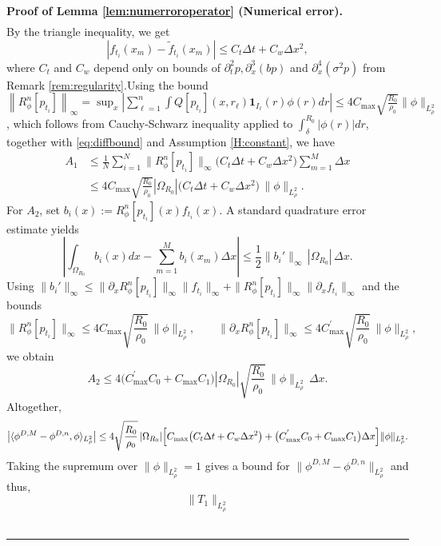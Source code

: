 \documentclass[12pt]{article}
\newenvironment{proof}[1][Proof]{\noindent\textbf{#1.} }{\ \rule{0.5em}{0.5em}}
\numberwithin{equation}{section}
\numberwithin{theorem}{section}
\begin{document}
\begin{proof}[Proof of Lemma \ref{lem:numerroroperator} (Numerical error)]
\begin{equation}
\begin{aligned}
\end{aligned}
\end{equation}
By the triangle inequality, we get
\begin{equation}
\left|f_{t_i}\left(x_m\right)-\tilde{f}_{t_i}\left(x_m\right)\right| \le C_t \Delta t+C_w \Delta x^2,
\end{equation}
where $C_t$ and $C_w$ depend only on bounds of $\partial_t^2 p, \partial_x^3(b p)$ and $\partial_x^4\left(\sigma^2 p\right)$ from Remark \eqref{rem:regularity}.Using the bound $\left\|R_\phi^n\left[p_{t_i}\right]\right\|_{\infty}=\sup _x\left|\sum_{\ell=1}^n \int Q\left[p_{t_i}\right]\left(x, r_{\ell}\right) \mathbf{1}_{I_{\ell}}(r) \phi(r) d r\right| \leq 4 C_{\max } \sqrt{\frac{R_0}{\rho_{0 }}}\|\phi\|_{L_\rho^2}$, which follows from Cauchy-Schwarz inequality applied to $\int_{\delta}^{R_0}|\phi(r)| d r$, together with  \eqref{eq:diffbound} and Assumption \ref{H:constant}, we have
$$
\begin{aligned}
A_1 
&\le \frac{1}{N}\sum_{i=1}^N \|R_\phi^n[p_{t_i}]\|_\infty
     \bigl(C_t \Delta t+C_w \Delta x^2\bigr)\sum_{m=1}^M \Delta x \\
&\le 4 C_{\max } \sqrt{\frac{R_0}{\rho_{0}}} 
   |\Omega_{R_0}|\bigl(C_t \Delta t+C_w \Delta x^2\bigr)\,\|\phi\|_{L^2_{\rho}}.
\end{aligned}
$$
For $A_2$, set $b_i(x):=R^n_{\phi}\left[p_{t_i}\right](x) f_{t_i}(x)$. A standard quadrature error estimate yields
$$
\left|\int_{\Omega_{R_0}} b_{i}(x) d x-\sum_{m=1}^M b_{i} \left(x_m\right) \Delta x\right| 
\le \frac{1}{2}\|b_i'\|_\infty\,|\Omega_{R_0}|\,\Delta x.
$$
Using $\|b_i'\|_\infty 
\le \|\partial_x R^n_{\phi}[p_{t_i}]\|_\infty\|f_{t_i}\|_\infty +\|R^n_{\phi}[p_{t_i}]\|_\infty\|\partial_x f_{t_i}\|_\infty$ and the bounds
$$
\|R_{\phi}^n[p_{t_i}]\|_{\infty}
\le 4 C_{\max } \sqrt{\frac{R_0}{\rho_{0}}}\,\|\phi\|_{L^2_{\rho}},
\qquad
\|\partial_x R_{\phi}^n[p_{t_i}]\|_{\infty}
\le 4 C_{\max }^{'} \sqrt{\frac{R_0}{\rho_{0}}}\,\|\phi\|_{L^2_{\rho}},
$$
we obtain
$$
A_2 \le 4 \bigl( C_{\max }^{'} C_0 +  C_{\max } C_1\bigr) 
|\Omega_{R_0}|\sqrt{\frac{R_0}{\rho_{0}}}\,\|\phi\|_{L^2_{\rho}}\,\Delta x.
$$
Altogether,
$$
\bigl|\langle\phi^{D, M}-\phi^{D,n}, \phi\rangle_{L^2_{\rho}}\bigr|
\le 4 \sqrt{\frac{R_0}{\rho_{0}}}\,
|\Omega_{R_0}|\Bigl[
C_{\max}\bigl(C_t \Delta t+C_w \Delta x^2\bigr)  
+ \bigl( C_{\max }^{'} C_0 +  C_{\max } C_1\bigr)\Delta x
\Bigr]\|\phi\|_{L^2_{\rho}}.
$$
Taking the supremum over $\|\phi\|_{L^2_\rho}=1$ gives a bound for $\|\phi^{D,M} - \phi^{D,n}\|_{L^2_\rho}$ and thus, 
$$
\|T_1\|_{L^2_\rho}
$$
\end{proof}
\end{document}
